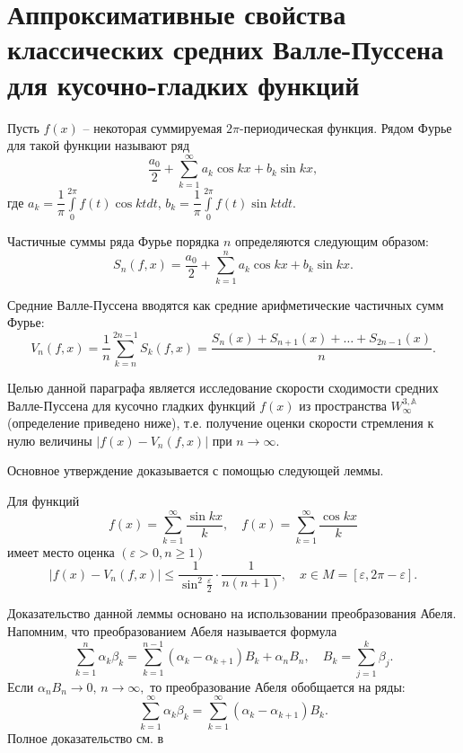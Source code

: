 \section{Аппроксимативные свойства классических средних Валле-Пуссена для кусочно-гладких функций}

Пусть $f(x)$ -- некоторая суммируемая $2\pi$-периодическая функция. Рядом Фурье для такой функции называют ряд
\begin{equation*}
\frac{a_0}{2}+\sum\limits_{k=1}^\infty a_k \cos kx + b_k \sin kx,
\end{equation*}
где $a_k=\dfrac{1}{\pi}\int\limits_{0}^{2\pi} f(t)\cos kt dt$, $b_k=\dfrac{1}{\pi}\int\limits_{0}^{2\pi} f(t)\sin kt dt$.

Частичные суммы ряда Фурье порядка $n$ определяются следующим образом:
\begin{equation*}
S_n(f,x) = \frac{a_0}{2}+\sum\limits_{k=1}^{n} a_k \cos kx + b_k \sin kx.
\end{equation*}

Средние Валле-Пуссена вводятся как средние арифметические частичных сумм Фурье:
\begin{equation*}
V_n(f,x) = \dfrac{1}{n}\sum\limits_{k=n}^{2n-1} S_k(f,x) = \dfrac{S_n(x)+S_{n+1}(x)+\ldots+S_{2n-1}(x)}{n}.
\end{equation*}

Целью данной параграфа является исследование скорости сходимости средних Валле-Пуссена для кусочно гладких функций $f(x)$ из пространства $W_\infty^{3,\mathds{A}}$ (определение приведено ниже), т.е. получение оценки скорости стремления к нулю величины $|f(x)-V_n(f,x)|$ при $n\rightarrow\infty$.

\noindent Основное утверждение доказывается с помощью следующей леммы.
\begin{lemma}\label{SumSinCosLemma}
Для функций
\begin{equation*}
f(x)=\sum\limits_{k=1}^\infty \dfrac{\sin kx}{k}, \quad f(x)=\sum\limits_{k=1}^\infty \dfrac{\cos kx}{k}
\end{equation*}
имеет место оценка $(\varepsilon > 0, n \ge 1)$
$$
|f(x) - V_n(f,x)| \leq \dfrac{1}{\sin^2\frac{\varepsilon}{2}} \cdot \dfrac{1}{n(n+1)}, \quad x\in M=[\varepsilon,2\pi-\varepsilon].
$$
\end{lemma}
Доказательство данной леммы основано на использовании преобразования Абеля. Напомним, что преобразованием Абеля называется формула
\begin{equation*}
\sum\limits_{k=1}^n \alpha_k \beta_k = \sum\limits_{k=1}^{n-1} (\alpha_k-\alpha_{k+1})B_k + \alpha_n B_n, \quad B_k=\sum\limits_{j=1}^k \beta_j.
\end{equation*}
Если $\alpha_nB_n \to 0,\, n \to \infty,$ то преобразование Абеля обобщается на ряды:
\begin{equation*}
\sum\limits_{k=1}^\infty \alpha_k \beta_k = \sum\limits_{k=1}^{\infty} (\alpha_k-\alpha_{k+1})B_k.
\end{equation*}
Полное доказательство см. в \cite{mmg-classic-vallee-pussen}


